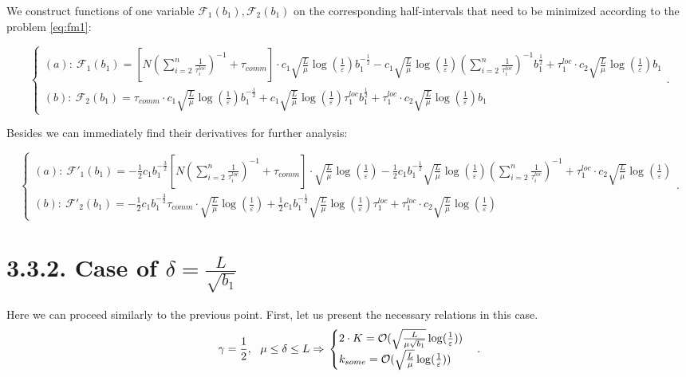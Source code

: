 \documentclass{article}
\theoremstyle{definition}
\theoremstyle{plain}
\begin{document}
We construct functions of one variable $\mathcal{F}_1(b_1), \mathcal{F}_2(b_1)$ on the corresponding half-intervals that need to be minimized according to the problem \eqref{eq:fm1}:


$$
\begin{cases}
(a): ~\mathcal{F}_1(b_1) = [N (\sum\limits_{i = 2}^{n} \frac{1}{\tau_i^{loc}})^{-1} + \tau_{comm}]\cdot 
c_1 \sqrt{\frac{L}{\mu}}\log (\frac{1}{\varepsilon})  b_1^{-\frac{1}{2}} - 
c_1  \sqrt{\frac{L}{\mu}}\log (\frac{1}{\varepsilon})(\sum\limits_{i =
2}^{n} \frac{1}{\tau_i^{loc}})^{-1} b_1^{\frac{1}{2}}  + \tau_1^{loc}\cdot c_2  \sqrt{\frac{L}{\mu}}\log (\frac{1}{\varepsilon}) b_1
\\
(b): ~\mathcal{F}_2(b_1) = \tau_{comm}\cdot 
c_1 \sqrt{\frac{L}{\mu}}\log (\frac{1}{\varepsilon})  b_1^{-\frac{1}{2}} + 
c_1  \sqrt{\frac{L}{\mu}}\log (\frac{1}{\varepsilon})\tau_1^{loc} b_1^{\frac{1}{2}}  + \tau_1^{loc}\cdot c_2  \sqrt{\frac{L}{\mu}}\log (\frac{1}{\varepsilon}) b_1 
\end{cases}.$$


Besides we can immediately find their derivatives for further analysis:


$$
\begin{cases}
(a): ~\mathcal{F'}_1(b_1) = -\frac{1}{2}c_1 b_1^{-\frac{3}{2}}  [N (\sum\limits_{i = 2}^{n} \frac{1}{\tau_i^{loc}})^{-1} + \tau_{comm}]\cdot 
\sqrt{\frac{L}{\mu}}\log (\frac{1}{\varepsilon})  - 
\frac{1}{2} c_1 b_1^{-\frac{1}{2}}   \sqrt{\frac{L}{\mu}}\log (\frac{1}{\varepsilon})(\sum\limits_{i = 2}^{n} \frac{1}{\tau_i^{loc}})^{-1} +
\tau_1^{loc}\cdot c_2  \sqrt{\frac{L}{\mu}}\log (\frac{1}{\varepsilon})
\\
(b): ~\mathcal{F'}_2(b_1) = -\frac{1}{2}c_1 b_1^{-\frac{3}{2}} \tau_{comm}\cdot \sqrt{\frac{L}{\mu}}\log (\frac{1}{\varepsilon}) + \frac{1}{2} c_1 b_1^{-\frac{1}{2}}  \sqrt{\frac{L}{\mu}}\log (\frac{1}{\varepsilon})\tau_1^{loc}   + \tau_1^{loc}\cdot c_2  \sqrt{\frac{L}{\mu}}\log (\frac{1}{\varepsilon})
\end{cases}.
$$


\section*{3.3.2. Case of $\delta = \frac{L}{\sqrt{b_1}}$}
Here we can proceed similarly to the previous point. First, let us present the necessary relations in this case.
\begin{equation}
    \notag
    \gamma = \frac{1}{2},~~ \mu \leq \delta \leq L \Rightarrow 
    \\
    \notag
    \begin{cases}
      2\cdot K = \mathcal O(\sqrt{\frac{L}{\mu \sqrt{b_1}}}\log(\frac{1}{\varepsilon}))\\
      k_{some} = \mathcal O(\sqrt{\frac{L}{\mu}}\log(\frac{1}{\varepsilon}))
    \end{cases}.
\end{equation}
\end{document}

